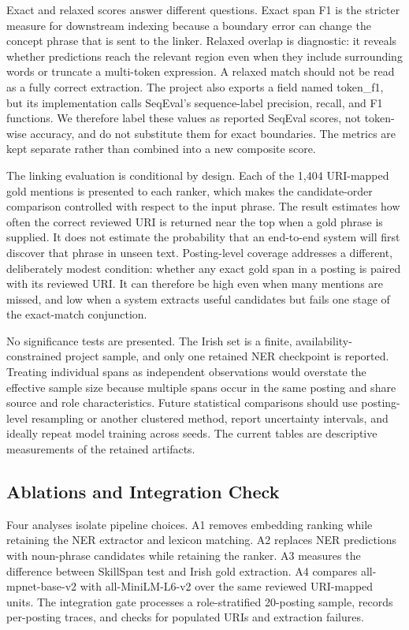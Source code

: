 \documentclass[conference]{IEEEtran}
\begin{document}
Exact and relaxed scores answer different questions. Exact span F1 is the stricter measure for downstream indexing because a boundary error can change the concept phrase that is sent to the linker. Relaxed overlap is diagnostic: it reveals whether predictions reach the relevant region even when they include surrounding words or truncate a multi-token expression. A relaxed match should not be read as a fully correct extraction. The project also exports a field named \textsf{token\_f1}, but its implementation calls SeqEval's sequence-label precision, recall, and F1 functions. We therefore label these values as reported SeqEval scores, not token-wise accuracy, and do not substitute them for exact boundaries. The metrics are kept separate rather than combined into a new composite score.

The linking evaluation is conditional by design. Each of the 1,404 URI-mapped gold mentions is presented to each ranker, which makes the candidate-order comparison controlled with respect to the input phrase. The result estimates how often the correct reviewed URI is returned near the top when a gold phrase is supplied. It does not estimate the probability that an end-to-end system will first discover that phrase in unseen text. Posting-level coverage addresses a different, deliberately modest condition: whether any exact gold span in a posting is paired with its reviewed URI. It can therefore be high even when many mentions are missed, and low when a system extracts useful candidates but fails one stage of the exact-match conjunction.

No significance tests are presented. The Irish set is a finite, availability-constrained project sample, and only one retained NER checkpoint is reported. Treating individual spans as independent observations would overstate the effective sample size because multiple spans occur in the same posting and share source and role characteristics. Future statistical comparisons should use posting-level resampling or another clustered method, report uncertainty intervals, and ideally repeat model training across seeds. The current tables are descriptive measurements of the retained artifacts.

\subsection{Ablations and Integration Check}
Four analyses isolate pipeline choices. A1 removes embedding ranking while retaining the NER extractor and lexicon matching. A2 replaces NER predictions with noun-phrase candidates while retaining the ranker. A3 measures the difference between SkillSpan test and Irish gold extraction. A4 compares \textsf{all-mpnet-base-v2} with \textsf{all-MiniLM-L6-v2} over the same reviewed URI-mapped units. The integration gate processes a role-stratified 20-posting sample, records per-posting traces, and checks for populated URIs and extraction failures.
\end{document}
